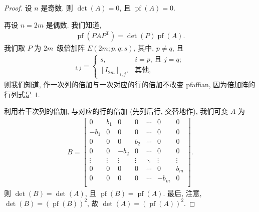 \documentclass[../libro]{subfiles}
\begin{document}
\begin{proof}
    设 \(n\) 是奇数.
    则 \(\det {(A)} = 0\),
    且 \(\operatorname{pf} {(A)} = 0\).

    再设 \(n = 2m\) 是偶数.
    我们知道,
    \begin{align*}
        \operatorname{pf} {(P A P^{\mathrm{T}})}
        = \det {(P)} \operatorname{pf} {(A)}.
    \end{align*}
    我们取 \(P\) 为
    \(2m\)~级倍加阵 \(E(2m; p, q; s)\),
    其中, \(p \neq q\), 且
    \begin{align*}
        [E(2m; p, q; s)]_{i,j}
        = \begin{cases}
              s,              & \text{\(i = p\), 且 \(j = q\)}; \\
              [I_{2m}]_{i,j}, & \text{其他},
          \end{cases}
    \end{align*}
    则我们知道,
    作一次列的倍加与一次对应的行的倍加不改变 pfaffian,
    因为倍加阵的行列式是 \(1\).

    利用若干次列的倍加, 与对应的行的倍加
    (先列后行, 交替地作),
    我们可变 \(A\) 为
    \begin{align*}
        B =
        \begin{bmatrix}
            0      & b_1    & 0      & 0      & \cdots & 0      & 0      \\
            -b_1   & 0      & 0      & 0      & \cdots & 0      & 0      \\
            0      & 0      & 0      & b_2    & \cdots & 0      & 0      \\
            0      & 0      & -b_2   & 0      & \cdots & 0      & 0      \\
            \vdots & \vdots & \vdots & \vdots & \ddots & \vdots & \vdots \\
            0      & 0      & 0      & 0      & \cdots & 0      & b_m    \\
            0      & 0      & 0      & 0      & \cdots & -b_m   & 0      \\
        \end{bmatrix}.
    \end{align*}
    则 \(\det {(B)} = \det {(A)}\),
    且 \(\operatorname{pf} {(B)} = \operatorname{pf} {(A)}\).
    最后, 注意, \(\det {(B)}
    = (\operatorname{pf} {(B)})^2\),
    故 \(\det {(A)}
    = (\operatorname{pf} {(A)})^2\).
\end{proof}
\end{document}
